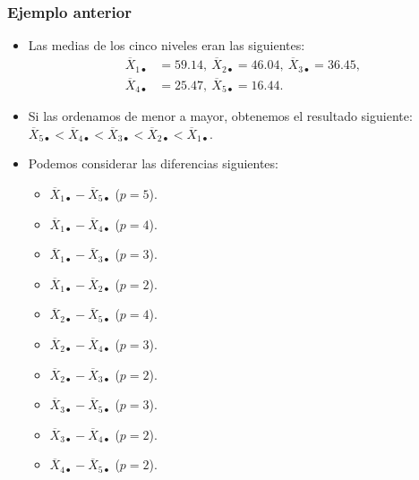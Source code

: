 \begin{frame}
\frametitle{Ejemplo anterior}
\begin{itemize}
\item<2-> Las medias de los cinco niveles eran las siguientes:
$$
\begin{array}{rl}
\overline{X}_{1\bullet}& =59.14,\  \overline{X}_{2\bullet}=46.04,\ \overline{X}_{3\bullet}=36.45,\\
\overline{X}_{4\bullet}& =25.47,\ \overline{X}_{5\bullet}= 16.44.
\end{array}
$$
\item<3-> Si las ordenamos de menor a mayor, obtenemos el resultado siguiente: $\overline{X}_{5\bullet} < \overline{X}_{4\bullet} <
\overline{X}_{3\bullet} < \overline{X}_{2\bullet} < \overline{X}_{1\bullet}$.
\item<4-> Podemos considerar las diferencias siguientes:
\begin{itemize}
\item<5-> $\overline{X}_{1\bullet}-\overline{X}_{5\bullet}$ ($p=5$).
\item<6-> $\overline{X}_{1\bullet}-\overline{X}_{4\bullet}$ ($p=4$).
\item<7-> $\overline{X}_{1\bullet}-\overline{X}_{3\bullet}$ ($p=3$).
\item<8-> $\overline{X}_{1\bullet}-\overline{X}_{2\bullet}$ ($p=2$).
\item<9-> $\overline{X}_{2\bullet}-\overline{X}_{5\bullet}$ ($p=4$).
\item<10-> $\overline{X}_{2\bullet}-\overline{X}_{4\bullet}$ ($p=3$).
\item<11-> $\overline{X}_{2\bullet}-\overline{X}_{3\bullet}$ ($p=2$).
\item<12-> $\overline{X}_{3\bullet}-\overline{X}_{5\bullet}$ ($p=3$).
\item<13-> $\overline{X}_{3\bullet}-\overline{X}_{4\bullet}$ ($p=2$).
\item<14-> $\overline{X}_{4\bullet}-\overline{X}_{5\bullet}$ ($p=2$).
\end{itemize}
\end{itemize}
\end{frame}

